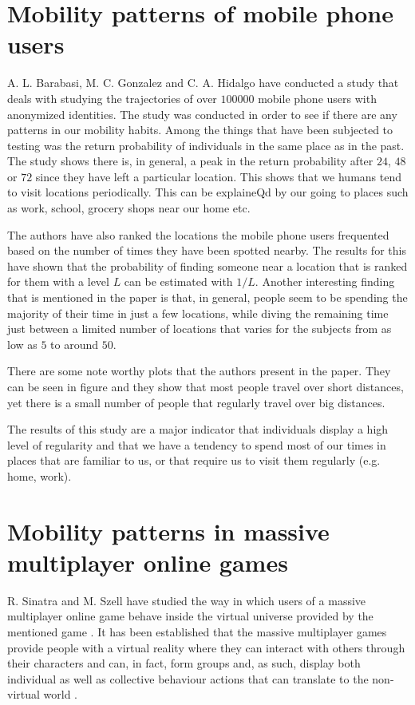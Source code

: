 \section{Mobility patterns of mobile phone users}
A. L. Barabasi, M. C. Gonzalez and C. A. Hidalgo have conducted a study
\cite{Barabasi08} that deals with studying the trajectories of over $100000$
mobile phone users with anonymized identities. The study was conducted in order
to see if there are any patterns in our mobility habits. Among the things that
have been subjected to testing was the return probability of individuals in the
same place as in the past. The study shows there is, in general, a peak in the
return probability after $24$, $48$ or $72$ since they have left a particular
location. This shows that we humans tend to visit locations periodically. This
can be explaineQd by our going to places such as work, school, grocery shops
near our home etc.

The authors have also ranked the locations the mobile phone users frequented
based on the number of times they have been spotted nearby. The results for this
have shown that the probability of finding someone near a location that is
ranked for them with a level $L$ can be estimated with $1/L$. Another
interesting finding that is mentioned in the paper is that, in general, people
seem to be spending the majority of their time in just a few locations, while
diving the remaining time just between a limited number of locations that varies
for the subjects from as low as $5$ to around $50$.

There are some note worthy plots that the authors present in the paper. They can
be seen in figure{} and they show that most people travel over short distances,
yet there is a small number of people that regularly travel over big distances.

The results of this study are a major indicator that individuals display a high
level of regularity and that we have a tendency to spend most of our times in
places that are familiar to us, or that require us to visit them regularly (e.g.
home, work).

\section{Mobility patterns in massive multiplayer online games}
R. Sinatra and M. Szell have studied the way in which users of a massive
multiplayer online game behave inside the virtual universe provided by the
mentioned game \cite{Sinatra14}. It has been established that the massive
multiplayer games provide people with a virtual reality where they can interact
with others through their characters and can, in fact, form groups and, as such,
display both individual as well as collective behaviour actions that can
translate to the non-virtual world \cite{Ball03}.

